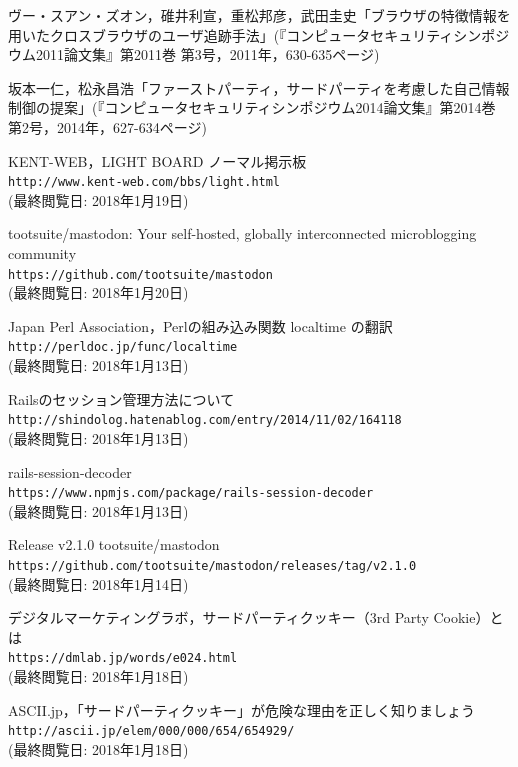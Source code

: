 \documentclass[10pt, a4paper]{jreport}
\begin{document}
\begin{thebibliography}{n}
 ヴー・スアン・ズオン，碓井利宣，重松邦彦，武田圭史「ブラウザの特徴情報を用いたクロスブラウザのユーザ追跡手法」(『コンピュータセキュリティシンポジウム2011論文集』第2011巻 第3号，2011年，630-635ページ)

 坂本一仁，松永昌浩「ファーストパーティ，サードパーティを考慮した自己情報制御の提案」(『コンピュータセキュリティシンポジウム2014論文集』第2014巻 第2号，2014年，627-634ページ)

 KENT-WEB，LIGHT BOARD ノーマル掲示板\\
\verb|http://www.kent-web.com/bbs/light.html|\\
(最終閲覧日: 2018年1月19日)

 tootsuite/mastodon: Your self-hosted, globally interconnected microblogging community\\
\verb|https://github.com/tootsuite/mastodon|\\
(最終閲覧日: 2018年1月20日)

 Japan Perl Association，Perlの組み込み関数 localtime の翻訳\\
\verb|http://perldoc.jp/func/localtime|\\
(最終閲覧日: 2018年1月13日)

 Railsのセッション管理方法について\\
\verb|http://shindolog.hatenablog.com/entry/2014/11/02/164118|\\
(最終閲覧日: 2018年1月13日)

 rails-session-decoder\\
\verb|https://www.npmjs.com/package/rails-session-decoder|\\
(最終閲覧日: 2018年1月13日)

 Release v2.1.0  tootsuite/mastodon\\
\verb|https://github.com/tootsuite/mastodon/releases/tag/v2.1.0|\\
(最終閲覧日: 2018年1月14日)

 デジタルマーケティングラボ，サードパーティクッキー（3rd Party Cookie）とは\\
\verb|https://dmlab.jp/words/e024.html|\\
(最終閲覧日: 2018年1月18日)

 ASCII.jp，「サードパーティクッキー」が危険な理由を正しく知りましょう\\
\verb|http://ascii.jp/elem/000/000/654/654929/|\\
(最終閲覧日: 2018年1月18日)


\end{thebibliography}
\end{document}
